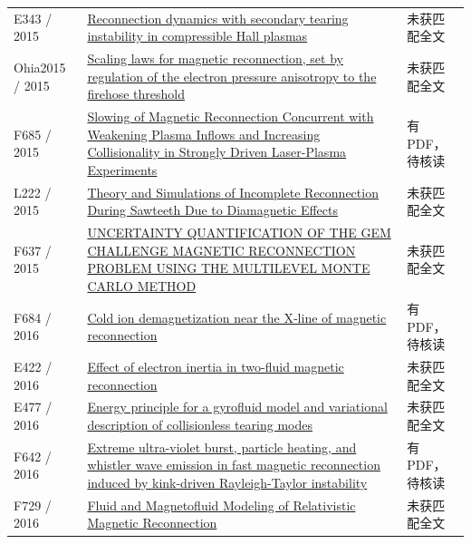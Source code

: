 \begin{longtable}{P{24mm}P{97mm}P{27mm}}
E343 / 2015 & \href{https://doi.org/10.1063/1.4922057}{Reconnection dynamics with secondary tearing instability in compressible Hall plasmas} & 未获匹配全文\\

Ohia2015 / 2015 & \href{https://doi.org/10.1002/2015GL067117}{Scaling laws for magnetic reconnection,  set by regulation of the electron pressure anisotropy to the firehose threshold} & 未获匹配全文\\

F685 / 2015 & \href{https://doi.org/10.1103/physrevlett.114.205004}{Slowing of Magnetic Reconnection Concurrent with Weakening Plasma Inflows and Increasing Collisionality in Strongly Driven Laser-Plasma Experiments} & 有PDF，待核读\\

L222 / 2015 & \href{https://doi.org/10.33915/etd.5178}{Theory and Simulations of Incomplete Reconnection During Sawteeth Due to Diamagnetic Effects} & 未获匹配全文\\

F637 / 2015 & \href{https://doi.org/10.1615/int.j.uncertaintyquantification.2015006492}{UNCERTAINTY QUANTIFICATION OF THE GEM CHALLENGE MAGNETIC RECONNECTION PROBLEM USING THE MULTILEVEL MONTE CARLO METHOD} & 未获匹配全文\\

F684 / 2016 & \href{https://doi.org/10.1002/2016gl069877}{Cold ion demagnetization near the X‐line of magnetic reconnection} & 有PDF，待核读\\

E422 / 2016 & \href{http://ui.adsabs.harvard.edu/abs/2016cosp...41E.697G/abstract}{Effect of electron inertia in two-fluid magnetic reconnection} & 未获匹配全文\\

E477 / 2016 & \href{http://absimage.aps.org/image/DPP16/MWS_DPP16-2016-000949.pdf}{Energy principle for a gyrofluid model and variational description of collisionless tearing modes} & 未获匹配全文\\

F642 / 2016 & \href{https://doi.org/10.1063/1.4944390}{Extreme ultra-violet burst,  particle heating,  and whistler wave emission in fast magnetic reconnection induced by kink-driven Rayleigh-Taylor instability} & 有PDF，待核读\\

F729 / 2016 & \href{http://citeseerx.ist.psu.edu/viewdoc/summary?doi=10.1.1.743.7627}{Fluid and Magnetofluid Modeling of Relativistic Magnetic Reconnection} & 未获匹配全文\\


\end{longtable}
